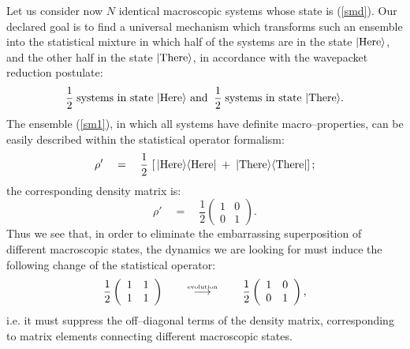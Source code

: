 \documentclass[12pt]{article}
\begin{document}
Let us consider now $N$ identical macroscopic systems whose state
is (\ref{smd}). Our declared goal is to find a universal mechanism
which transforms such an ensemble into the statistical mixture in
which half of the systems are in the state
$|\makebox{Here}\rangle$, and the other half in the state
$|\makebox{There}\rangle$, in accordance with the wavepacket
reduction postulate:
\begin{equation} \label{sm1}
\frac{1}{2}\;\makebox{systems in state $|\makebox{Here}\rangle$
and}\;\; \frac{1}{2}\;\makebox{systems in state
$|\makebox{There}\rangle$}.
\end{equation}
The ensemble (\ref{sm1}), in which all systems have definite
macro--properties, can be easily described within the statistical
operator formalism:
\begin{equation} \label{sop}
\rho' \quad = \quad \frac{1}{2}\,\left[\,
|\makebox{Here}\rangle\langle\makebox{Here}| \; + \;
|\makebox{There}\rangle\langle\makebox{There}| \right];
\end{equation}
the corresponding density matrix is:
\begin{equation} \label{ppp}
\rho' \quad = \quad \frac{1}{2} \left(
\begin{array}{cc}
1 & 0 \\ 0 & 1
\end{array}
\right).
\end{equation}
Thus we see that, in order to eliminate the embarrassing
superposition of different macroscopic states, the dynamics we are
looking for must induce the following change of the statistical
operator:
\begin{equation} \label{deso}
\frac{1}{2} \left(
\begin{array}{cc}
1 & 1 \\ 1 & 1
\end{array}
\right) \qquad \stackrel{\makebox{\tiny
evolution}}{\longrightarrow} \qquad \frac{1}{2} \left(
\begin{array}{cc}
1 & 0 \\ 0 & 1
\end{array}
\right),
\end{equation}
i.e. it must suppress the off--diagonal terms of the density
matrix, corresponding to  matrix elements connecting different
macroscopic states.
\end{document}
